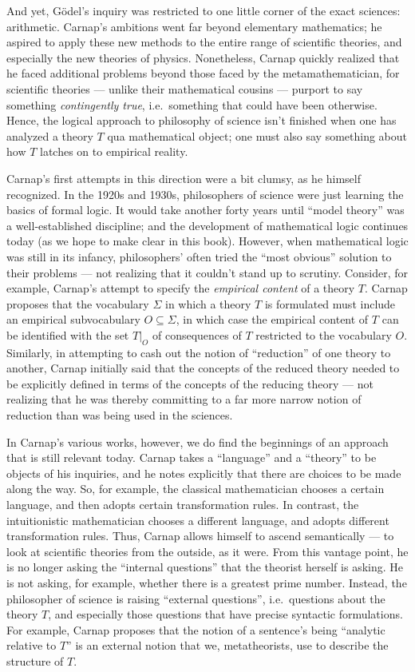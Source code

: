 And yet, G\"odel's inquiry was restricted to one little corner of the
exact sciences: arithmetic.  Carnap's ambitions went far beyond
elementary mathematics; he aspired to apply these new methods to the
entire range of scientific theories, and especially the new theories
of physics.  Nonetheless, Carnap quickly realized that he faced
additional problems beyond those faced by the metamathematician, for
scientific theories --- unlike their mathematical cousins --- purport
to say something {\it contingently true}, i.e.\ something that could
have been otherwise.  Hence, the logical approach to philosophy of
science isn't finished when one has analyzed a theory $T$ qua
mathematical object; one must also say something about how $T$ latches
on to empirical reality.

Carnap's first attempts in this direction were a bit clumsy, as he
himself recognized.  In the 1920s and 1930s, philosophers of science
were just learning the basics of formal logic.  It would take another
forty years until ``model theory'' was a well-established discipline;
and the development of mathematical logic continues today (as we hope
to make clear in this book).  However, when mathematical logic was
still in its infancy, philosophers' often tried the ``most obvious''
solution to their problems --- not realizing that it couldn't stand up
to scrutiny.  Consider, for example, Carnap's attempt to specify the
{\it empirical content} of a theory $T$.  Carnap proposes that the
vocabulary $\Sigma$ in which a theory $T$ is formulated must include
an empirical subvocabulary $O\subseteq \Sigma $, in which case the
empirical content of $T$ can be identified with the set $T|_O$ of
consequences of $T$ restricted to the vocabulary $O$.  Similarly, in
attempting to cash out the notion of ``reduction'' of one theory to
another, Carnap initially said that the concepts of the reduced theory
needed to be explicitly defined in terms of the concepts of the
reducing theory --- not realizing that he was thereby committing to a
far more narrow notion of reduction than was being used in the
sciences.

In Carnap's various works, however, we do find the beginnings of an
approach that is still relevant today.  Carnap takes a ``language''
and a ``theory'' to be objects of his inquiries, and he notes
explicitly that there are choices to be made along the way.  So, for
example, the classical mathematician chooses a certain language, and
then adopts certain transformation rules.  In contrast, the
intuitionistic mathematician chooses a different language, and adopts
different transformation rules.  Thus, Carnap allows himself to ascend
semantically --- to look at scientific theories from the outside, as
it were.  From this vantage point, he is no longer asking the
``internal questions'' that the theorist herself is asking.  He is not
asking, for example, whether there is a greatest prime number.
Instead, the philosopher of science is raising ``external questions'',
i.e.\ questions about the theory $T$, and especially those questions
that have precise syntactic formulations.  For example, Carnap
proposes that the notion of a sentence's being ``analytic relative to
$T$'' is an external notion that we, metatheorists, use to describe
the structure of $T$.

